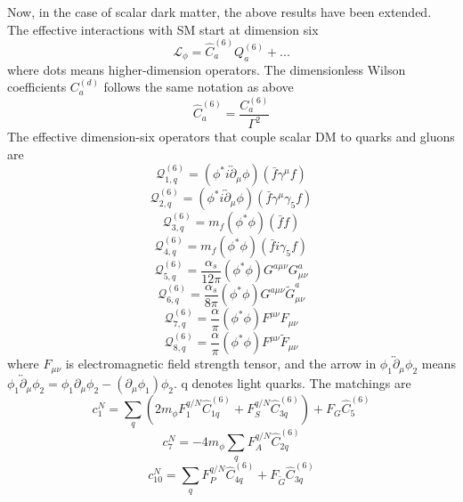 \documentclass[12pt]{article}
\begin{document}
Now, in the case of scalar dark matter, the above results have been extended. The effective interactions with SM start at dimension six 
$$
\mathcal L_\phi = \hat C_a^{(6)} Q_a^{(6)} + ... 
$$
where dots means higher-dimension operators. The dimensionless Wilson coefficients $C_a^{(d)} $ follows the same notation as above
$$
\hat C_a^{(6)} = \frac{C_a^{(6)}}{\Gamma^2}
$$
The effective dimension-six operators that couple scalar DM to quarks and gluons are 
$$
\mathcal Q_{1,q}^{(6)} = (\phi^* i \overleftrightarrow\partial_\mu \phi ) ( \bar f \gamma^\mu f ) 
$$
$$
\mathcal Q_{2,q}^{(6)} = (\phi^* i \overleftrightarrow\partial_\mu \phi ) ( \bar f \gamma^\mu \gamma_5 f ) 
$$
$$
\mathcal Q_{3,q}^{(6)} = m_f (\phi^*  \phi ) ( \bar f  f ) 
$$
$$
\mathcal Q_{4,q}^{(6)} = m_f (\phi^*  \phi ) ( \bar f i\gamma_5 f ) 
$$
$$
\mathcal Q_{5,q}^{(6)} = \frac{\alpha_s}{12 \pi} (\phi^*  \phi ) G^{a\mu\nu}G_{\mu\nu}^a
$$
$$
\mathcal Q_{6,q}^{(6)} = \frac{\alpha_s}{8 \pi} (\phi^*  \phi ) G^{a\mu\nu}\tilde G_{\mu\nu}^a
$$
$$
\mathcal Q_{7,q}^{(6)} = \frac{\alpha}{ \pi} (\phi^*  \phi ) F^{\mu\nu} F_{\mu\nu}
$$
$$
\mathcal Q_{8,q}^{(6)} = \frac{\alpha}{ \pi} (\phi^*  \phi ) F^{\mu\nu}\tilde F_{\mu\nu}
$$
where $F_{\mu\nu}$ is electromagnetic field strength tensor, and the arrow in $\phi_1 \overleftrightarrow\partial_\mu \phi_2$ means $\phi_1 \overleftrightarrow\partial_\mu \phi_2 = \phi_1 \partial_\mu \phi_2 - (\partial_\mu \phi_1) \phi_2 $. q denotes light quarks. 
The matchings are
$$
c_1^N  = \sum_q ( 2 m_\phi F_1^{q/N} \hat C_{1q}^{(6)} +F_S ^{q/N} \hat C_{3q}^{(6)} ) + F_G \hat C_5 ^{(6)}
$$
$$
c_7^N  = -4  m_\phi \sum_q  F_A^{q/N} \hat C_{2q}^{(6)} 
$$
$$
c_{10}^N  = \sum_q  F_P^{q/N} \hat C_{4q}^{(6)} +F_{\tilde G} \hat C_{3q}^{(6)}
$$
\end{document}
